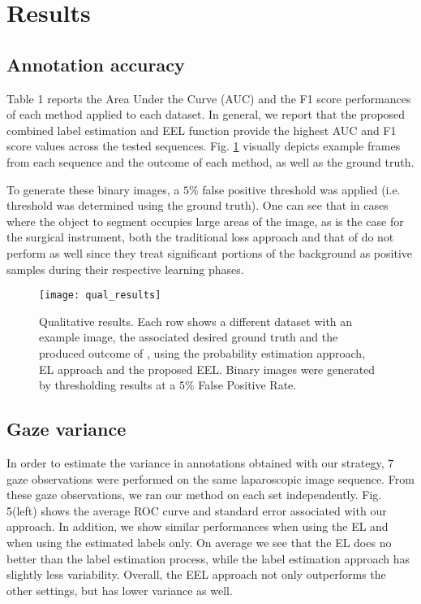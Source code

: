 \section{Results}
\subsection{Annotation accuracy}
Table 1 reports the Area Under the Curve (AUC) and the F1 score performances of each method applied to each dataset.
In general, we report that the proposed combined label estimation and EEL function provide the highest AUC and F1 score values across the tested sequences.
Fig. \ref{fig:eel_qual_res} visually depicts example frames from each sequence and the outcome of each method, as well as the ground truth.

To generate these binary images, a $5\%$ false positive threshold was applied (i.e. threshold was determined using the ground truth).
One can see that in cases where the object to segment occupies large areas of the image,
as is the case for the surgical instrument, both the traditional loss approach and that of \cite{vilarino07} do not perform as well since they treat significant portions of the background as positive samples during their respective learning phases.
\begin{figure}
\texttt{[image: qual\_results]}
\caption{Qualitative results. Each row shows a different dataset with an example image,
the associated desired ground truth and the produced outcome of \cite{vilarino07}, using the probability
estimation approach, EL approach and the proposed EEL.
Binary images were generated by thresholding results at a $5\%$ False Positive Rate.}
\label{fig:eel_qual_res}
\end{figure}

\subsection{Gaze variance}
In order to estimate the variance in annotations obtained with our strategy, $7$ gaze observations were performed on the same laparoscopic image sequence.
From these gaze observations, we ran our method on each set independently.
Fig. 5(left) shows the average ROC curve and standard error associated with our approach.
In addition, we show similar performances when using the EL and when using the estimated labels only.
On average we see that the EL does no better than the label estimation process, while the label estimation approach has slightly less variability.
Overall, the EEL approach not only outperforms the other settings, but has lower variance as well.


